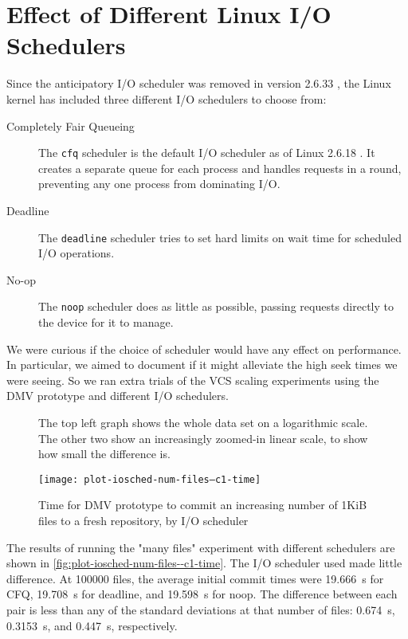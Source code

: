 %



\section{Effect of Different Linux I/O Schedulers}

Since the anticipatory I/O scheduler was removed in version 2.6.33
\cite{as_removed_linux_release_notes}, the Linux kernel has included three
different I/O schedulers to choose from\cite{ioschedulers}:

\begin{description}

    \item[Completely Fair Queueing] The \lstinline{cfq} scheduler is the default
        I/O scheduler as of Linux 2.6.18 \cite{cfq_default_linux_release_notes}.
        It creates a separate queue for each process and handles requests in a
        round, preventing any one process from dominating I/O.

    \item[Deadline] The \lstinline{deadline} scheduler tries to set hard limits
        on wait time for scheduled I/O operations.

    \item[No-op] The \lstinline{noop} scheduler does as little as possible,
        passing requests directly to the device for it to manage.

\end{description}

We were curious if the choice of scheduler would have any effect on performance.
In particular, we aimed to document if it might alleviate the high seek times we
were seeing. So we ran extra trials of the VCS scaling experiments using the
\gls{DMV} prototype and different I/O schedulers.

\begin{figure}[]
    \caption{Time for DMV prototype to commit an increasing number of 1KiB files
    to a fresh repository, by I/O scheduler}
    \label{fig:plot-iosched-num-files--c1-time}
    \centering

    The top left graph shows the whole data set on a logarithmic scale. The
    other two show an increasingly zoomed-in linear scale, to show how small the
    difference is.

    \texttt{[image: plot-iosched-num-files--c1-time]}
\end{figure}

The results of running the "many files" experiment with different schedulers are
shown in \autoref{fig:plot-iosched-num-files--c1-time}. The I/O scheduler used
made little difference. At \num{100000} files, the average initial \gls{commit}
times were \SI{19.666}{\s} for CFQ, \SI{19.708}{\s} for deadline, and
\SI{19.598}{\s} for noop. The difference between each pair is less than any of
the standard deviations at that number of files: \SI{0.674}{\s},
\SI{0.3153}{\s}, and \SI{0.447}{\s}, respectively.

